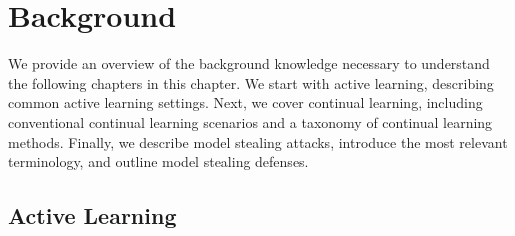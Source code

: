 
\chapter{Background}
\label{ch:Background}

We provide an overview of the background knowledge necessary to understand the following chapters in this chapter. We start with
active learning, describing common active learning settings. Next, we cover continual learning, including conventional continual learning
scenarios and a taxonomy of continual learning methods. Finally, we describe model stealing attacks, introduce the most relevant terminology,
and outline model stealing defenses.


\section{Active Learning}
\label{sec:ActiveLearning}

